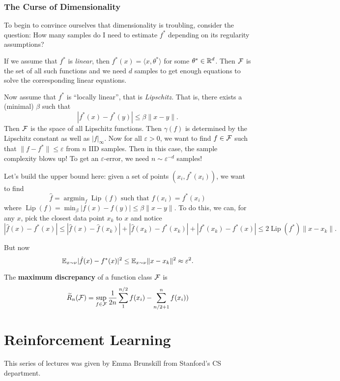 \documentclass[12pt]{article}
\DeclareMathOperator*{\argmin}{argmin}
\begin{document}
\subsubsection{The Curse of Dimensionality}
To begin to convince ourselves that dimensionality is troubling, consider the question: How many samples do I need to estimate $f^\ast$ 
depending on its regularity assumptions?

If we assume that $f^\ast$ is \textit{linear}, then $f^\ast(x)=\langle x,\theta^\ast\rangle$ for some $\theta^\ast\in\mathbb{R}^d$. Then $\mathcal{F}$ is the set of all such functions and we need $d$ samples to get enough equations to solve the corresponding linear equations.

Now assume that $f^\ast$ is ``locally linear'', that is \textit{Lipschitz.} That is, there exists a (minimal) $\beta$ such that 
\[|f^\ast(x)-f^\ast(y)|\le\beta\|x-y\|.\]
Then $\mathcal{F}$ is the space of all Lipschitz functions. Then $\gamma(f)$ is determined by the Lipschitz constant as well as $|f|_\infty$. Now for all $\varepsilon>0$, we want to find $f\in\mathcal{F}$ such that $\|f-f^\ast\|\le\varepsilon$ 
from $n$ IID samples. Then in this case, the sample complexity blows up! To get an $\varepsilon$-error, we need $n\sim \varepsilon^{-d}$ samples!

Let's build the upper bound here: given a set of points $(x_i,f^\ast(x_i))$, we want to find 
\[\hat f=\argmin_f\operatorname{Lip}(f)\text{  such that  }f(x_i)=f^\ast(x_i)\]
where $\operatorname{Lip}(f)=\min_\beta |f(x)-f(y)|\le\beta\|x-y\|$. To do this, we can, for any $x$, pick the closest data point $x_k$ to $x$ and notice 
\[|\hat f(x)-f^\ast(x)|\le|\hat f(x)-\hat f(x_k)|+|\hat f(x_k)-f^\ast(x_k)|+|f^\ast(x_k)-f^\ast(x)|\le2\operatorname{Lip}(f^\ast)\|x-x_k\|.\]

But now 
\[\mathbb{E}_{x\sim\nu}|\hat f(x)-f^\ast(x)|^2\le\mathbb{E}_{x\sim\nu}\|x-x_k\|^2\approx\varepsilon^2.\]

\begin{defn}
	The \textbf{maximum discrepancy} of a function class $\mathcal{F}$ is 
	\[\widetilde{R}_n(\mathcal{F})=\sup_{f\in\mathcal{F}}\frac{1}{2n}\sum_1^{n/2}f(x_i)-\sum_{n/2+1}^n f(x_i))\]
\end{defn}



\section{Reinforcement Learning}
This series of lectures was given by Emma Brunskill from Stanford's CS department.
\end{document}
